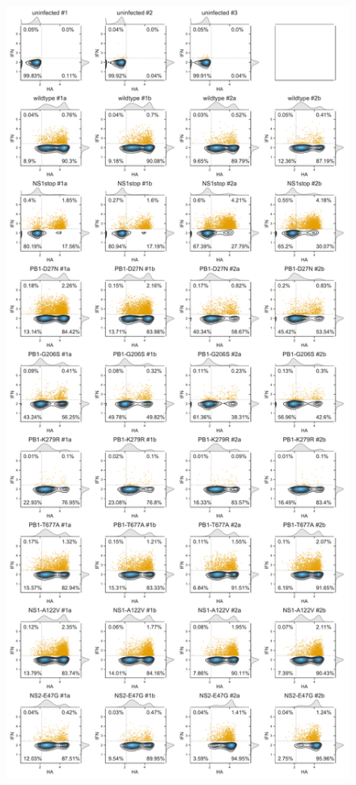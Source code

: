\documentclass[9pt,lineno]{elife}
\begin{document}
\begin{figure}
{\includegraphics[height=0.71\textheight]{figures/Validation_Figure/SNP_flow_plot.pdf}}
\label{figsupp:SNPflow}


\end{figure}
\end{document}
